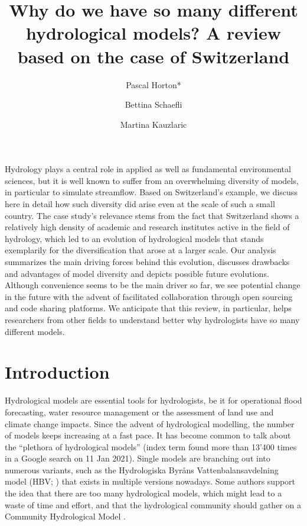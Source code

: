 \documentclass[10pt,a4paper]{article}
\renewenvironment{abstract}
 {{\bfseries\noindent{\abstractname}\par\nobreak}\footnotesize}
 {\bigskip}
\begin{document}
\title{Why do we have so many different hydrological models? A review based on the case of Switzerland}


\author[1]{Pascal Horton*}
\author[1]{Bettina Schaefli}
\author[1]{Martina Kauzlaric}


 \date{}


\begingroup
\maketitle
\endgroup




\begin{abstract}
Hydrology plays a central role in applied as well as fundamental environmental sciences, but it is well known to suffer from an overwhelming diversity of models, in particular to simulate streamflow. Based on Switzerland's example, we discuss here in detail how such diversity did arise even at the scale of such a small country. The case study's relevance stems from the fact that Switzerland shows a relatively high density of academic and research institutes active in the field of hydrology, which led to an evolution of hydrological models that stands exemplarily for the diversification that arose at a larger scale. Our analysis summarizes the main driving forces behind this evolution, discusses drawbacks and advantages of model diversity and depicts possible future evolutions. Although convenience seems to be the main driver so far, we see potential change in the future with the advent of facilitated collaboration through open sourcing and code sharing platforms. We anticipate that this review, in particular, helps researchers from other fields to understand better why hydrologists have so many different models.
\end{abstract}%


\section{Introduction}
\label{sec:intro}

Hydrological models are essential tools for hydrologists, be it for
operational flood forecasting, water resource management or the
assessment of land use and climate change impacts. Since the advent of
hydrological modelling, the number of models keeps increasing at a fast
pace. It has become common to talk about the ``plethora of hydrological
models'' (index term found more than 13'400 times in a Google search on
11 Jan 2021). Single models are branching out into numerous variants,
such as the Hydrologiska Byråns Vattenbalansavdelning model
(HBV; \citealp{Bergstrom1976a,Bergstrom1992,Bergstrom1995,Lindstr_m_1997}) 
that exists in multiple versions nowadays.
Some authors support the idea that there are too many hydrological
models, which might lead to a waste of time and effort, and that the
hydrological community should gather on a Community Hydrological
Model \citep{Weiler_2015}.
\end{document}
